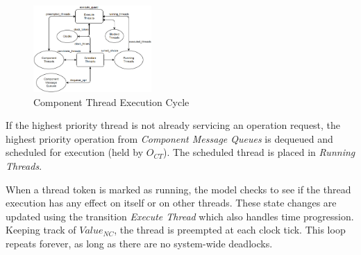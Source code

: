 \vspace{-0.1in}
\begin{figure}[htb]
	\centering
	\includegraphics[width=0.40\textwidth]{figs/Thread_Execution.png}
	\caption{Component Thread Execution Cycle}
	\label{fig:Thread_Execution}
\end{figure}

If the highest priority thread is not already servicing an operation request, the highest priority operation from \emph{Component Message Queues} is dequeued and scheduled for execution (held by $O_{CT}$). The scheduled thread is placed in \emph{Running Threads}. %

When a thread token is marked as running, the model checks to see if the thread execution has any effect on itself or on other threads. These state changes are updated using the transition \emph{Execute Thread} which also handles time progression. Keeping track of $Value_{NC}$, the thread is preempted at each clock tick. This loop repeats forever, as long as there are no system-wide deadlocks. 





